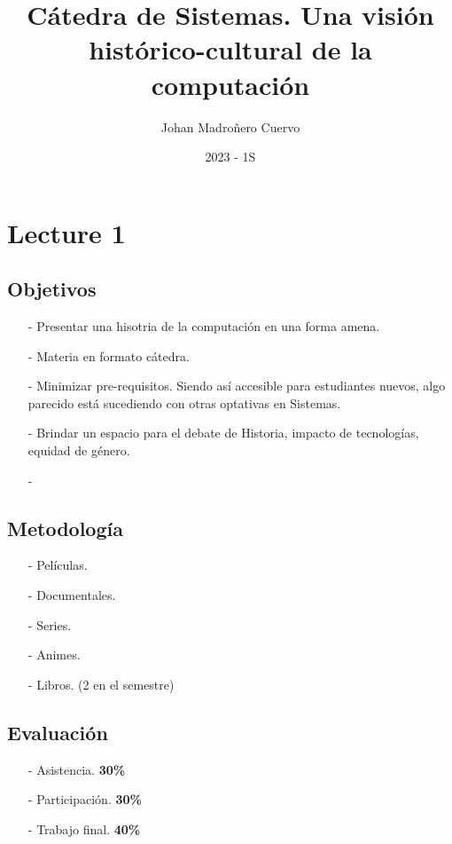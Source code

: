 \documentclass{article}
\author{Johan Madroñero Cuervo}
\title{Cátedra de Sistemas. Una visión histórico-cultural de la computación}
\date{2023 - 1S}
\theoremstyle{definition}
\begin{document}
\maketitle
\thispagestyle{empty}
\newpage
\tableofcontents
\thispagestyle{empty}
\newpage

\section{Lecture 1}

\subsection{Objetivos}

\begin{itemize}

  \item[-] Presentar una hisotria de la computación en una forma amena.
  \item[-] Materia en formato cátedra.
  \item[-] Minimizar pre-requisitos. Siendo así accesible para estudiantes
    nuevos, algo parecido está sucediendo con otras optativas en Sistemas.
  \item[-] Brindar un espacio para el debate de Historia, impacto de 
    tecnologías, equidad de género.
  \item[-] 

\end{itemize}

\subsection{Metodología}

\begin{itemize}

  \item[-] Películas.
  \item[-] Documentales.
  \item[-] Series.
  \item[-] Animes.
  \item[-] Libros. (2 en el semestre)

\end{itemize}

\subsection{Evaluación}

\begin{itemize}

  \item[-] Asistencia. \textbf{30\%}
  \item[-] Participación. \textbf{30\%}
  \item[-] Trabajo final. \textbf{40\%}

\end{itemize}
\end{document}
